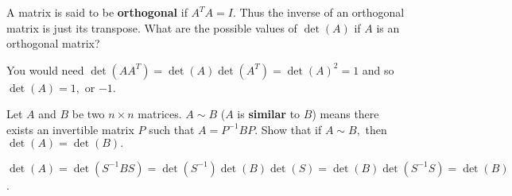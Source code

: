 \documentclass{ximera}
\begin{document}
\begin{problem}\label{prb:7.19} \label{exerorthogonal}A matrix is said to be \textbf{orthogonal}  if
$A^{T}A=I.$ Thus the inverse of an orthogonal matrix is just its transpose.
What are the possible values of $\det \left( A\right) $ if $A$ is an
orthogonal matrix?
\begin{hint}
You would need $\det \left( AA^{T}\right) =\det
\left( A\right) \det \left( A^{T}\right) =\det \left( A\right) ^{2}=1$ and
so $\det \left( A\right) =1,$ or $-1$.
\end{hint}
\end{problem}

\begin{problem}\label{prb:7.20} Let $A$ and $B$ be two $n\times n$ matrices. $A\sim B$
($A$ is \textbf{similar} to $B$) means there exists an invertible matrix $P$
such that $A=P^{-1}BP.$ Show that if $A\sim B,$ then
$\det \left( A\right) =\det \left( B\right) .$
\begin{hint}
$\det \left( A\right) =\det
\left( S^{-1}BS\right) =\det \left( S^{-1}\right) \det \left( B\right) \det
\left( S\right) =\det \left( B\right) \det \left( S^{-1}S\right) =\det
\left( B\right) $.
\end{hint}
\end{problem}
\end{document}
